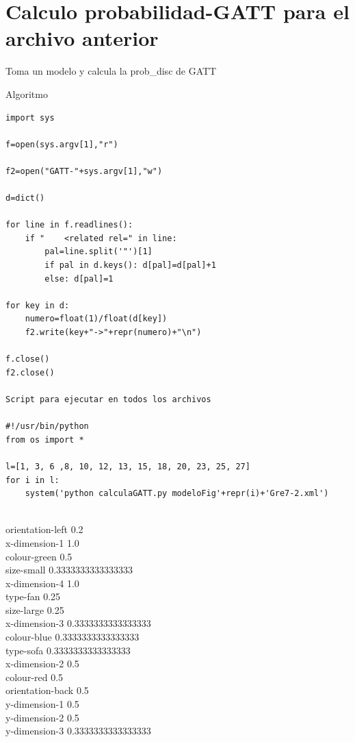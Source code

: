 \section{Calculo probabilidad-GATT para el archivo anterior}

Toma un modelo y calcula la prob\_disc de GATT 

Algoritmo\\
\label{algoritmo-GATT}
\begin{verbatim}
import sys

f=open(sys.argv[1],"r")

f2=open("GATT-"+sys.argv[1],"w")

d=dict()

for line in f.readlines():
    if "    <related rel=" in line:
        pal=line.split('"')[1]
        if pal in d.keys(): d[pal]=d[pal]+1
        else: d[pal]=1

for key in d:
    numero=float(1)/float(d[key])
    f2.write(key+"->"+repr(numero)+"\n")

f.close()
f2.close()

Script para ejecutar en todos los archivos

#!/usr/bin/python
from os import *

l=[1, 3, 6 ,8, 10, 12, 13, 15, 18, 20, 23, 25, 27]
for i in l:
    system('python calculaGATT.py modeloFig'+repr(i)+'Gre7-2.xml')


\end{verbatim}




\label{probabilidad-GATT}

orientation-left	0.2\\
x-dimension-1	1.0\\
colour-green	0.5\\
size-small	0.3333333333333333\\
x-dimension-4	1.0\\
type-fan	0.25\\
size-large	0.25\\
x-dimension-3	0.3333333333333333\\
colour-blue	0.3333333333333333\\
type-sofa	0.3333333333333333\\
x-dimension-2	0.5\\
colour-red	0.5\\
orientation-back	0.5\\
y-dimension-1	0.5\\
y-dimension-2	0.5\\
y-dimension-3	0.3333333333333333\\




